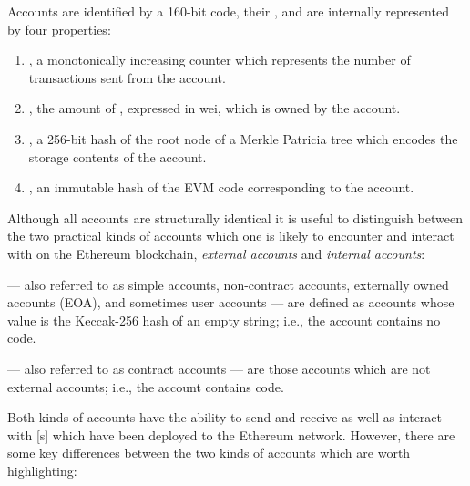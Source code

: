 Accounts are identified by a 160-bit code, their , and are
internally represented by four properties:

\begin{enumerate}
  \item {}, a monotonically increasing counter which represents the
    number of transactions sent from the account.
  \item {}, the amount of , expressed in wei, which is
    owned by the account.
  \item {}, a 256-bit hash of the root node of a Merkle Patricia
    tree which encodes the storage contents of the account.




  \item {}, an immutable hash of the EVM code corresponding to the
    account.
\end{enumerate}

Although all accounts are structurally identical it is useful to distinguish
between the two practical kinds of accounts which one is likely to encounter and
interact with on the Ethereum blockchain, \emph{external accounts} and
\emph{internal accounts}:
%
\begin{description}[font=\normalfont\emph]
  \item[External Accounts] --- also referred to as simple accounts, non-contract
    accounts, externally owned accounts (EOA), and sometimes user accounts ---
    are defined as accounts whose  value is the Keccak-256 hash of
    an empty string; i.e., the account contains no code.

  \item[Internal Accounts] --- also referred to as contract accounts --- are
    those accounts which are not external accounts; i.e., the account contains
    code.
\end{description}
%
Both kinds of accounts have the ability to send and receive  as well
as interact with [s] which have been deployed to the Ethereum
network. However, there are some key differences between the two kinds of
accounts which are worth highlighting:\cite{ethereum:accounts}

